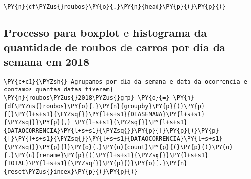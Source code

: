     \begin{tcolorbox}[breakable, size=fbox, boxrule=1pt, pad at break*=1mm,colback=cellbackground, colframe=cellborder]
\begin{Verbatim}[commandchars=\\\{\}]
\PY{n}{df\PYZus{}roubos}\PY{o}{.}\PY{n}{head}\PY{p}{(}\PY{p}{)}
\end{Verbatim}
\end{tcolorbox}

    \hypertarget{processo-para-boxplot-e-histograma-da-quantidade-de-roubos-de-carros-por-dia-da-semana-em-2018}{%
\subsection*{Processo para boxplot e histograma da quantidade de roubos
de carros por dia da semana em
2018}\label{processo-para-boxplot-e-histograma-da-quantidade-de-roubos-de-carros-por-dia-da-semana-em-2018}}

    \begin{tcolorbox}[breakable, size=fbox, boxrule=1pt, pad at break*=1mm,colback=cellbackground, colframe=cellborder]
\begin{Verbatim}[commandchars=\\\{\}]
\PY{c+c1}{\PYZsh{} Agrupamos por dia da semana e data da ocorrencia e contamos quantas datas tiveram}
\PY{n}{roubos\PYZus{}2018\PYZus{}grp} \PY{o}{=} \PY{n}{df\PYZus{}roubos}\PY{o}{.}\PY{n}{groupby}\PY{p}{(}\PY{p}{[}\PY{l+s+s1}{\PYZsq{}}\PY{l+s+s1}{DIASEMANA}\PY{l+s+s1}{\PYZsq{}}\PY{p}{,} \PY{l+s+s1}{\PYZsq{}}\PY{l+s+s1}{DATAOCORRENCIA}\PY{l+s+s1}{\PYZsq{}}\PY{p}{]}\PY{p}{)}\PY{p}{[}\PY{l+s+s1}{\PYZsq{}}\PY{l+s+s1}{DATAOCORRENCIA}\PY{l+s+s1}{\PYZsq{}}\PY{p}{]}\PY{o}{.}\PY{n}{count}\PY{p}{(}\PY{p}{)}\PY{o}{.}\PY{n}{rename}\PY{p}{(}\PY{l+s+s1}{\PYZsq{}}\PY{l+s+s1}{TOTAL}\PY{l+s+s1}{\PYZsq{}}\PY{p}{)}\PY{o}{.}\PY{n}{reset\PYZus{}index}\PY{p}{(}\PY{p}{)}
\end{Verbatim}
\end{tcolorbox}

